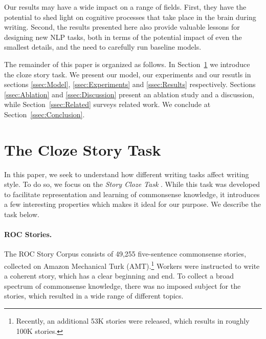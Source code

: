 \documentclass[11pt,a4paper]{article}
\newcommand{\secref}[1]{Section~\ref{ssec:#1}}
\newcommand{\isection}[2]{\section{#1}\label{ssec:#2}}
\begin{document}
Our results may have a wide impact on a range of fields. 
First, they have the potential to shed light on cognitive processes that take place in the brain during writing.
Second, the results presented here also provide valuable lessons for designing new NLP tasks,
both in terms of the potential impact of even the smallest details, and the need to carefully run baseline models.


The remainder of this paper is organized as follows. In \secref{ROC_Story} we introduce the cloze story task.
We present our model, our experiments and our resutls in sections \ref{ssec:Model}, \ref{ssec:Experiments} and \ref{ssec:Results} respectively.
Sections \ref{ssec:Ablation} and \ref{ssec:Discussion} present an ablation study and a discussion, while \secref{Related}  surveys related work. 
We conclude at \secref{Conclusion}.

\isection{The Cloze Story Task}{ROC_Story}
In this paper, we seek to understand how different writing tasks affect writing style.
To do so, we focus on the \textit{Story Cloze Task} \cite{Mostafazadeh:2016}. 
While this task was developed to facilitate representation and learning of commonsense knowledge,
it introduces a few interesting properties which makes it ideal for our purpose. 
We describe the task below.




\paragraph{ROC Stories.}

The ROC Story Corpus consists of 49,255 five-sentence commonsense stories, collected on Amazon Mechanical Turk (AMT).\footnote{Recently, an additional 53K stories were released, which results in roughly 100K stories.}
Workers were instructed to write a coherent story, which has a clear beginning and end. 
To collect a broad spectrum of commonsense knowledge, there was no imposed subject for the stories,
which resulted in a wide range of different topics.
\end{document}
